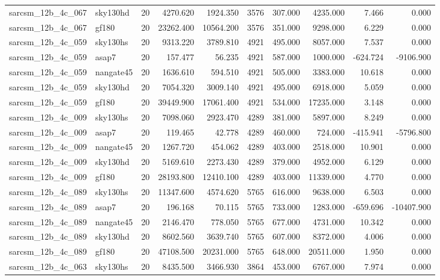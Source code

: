 \documentclass{article}
\begin{document}
\begin{longtable}{llrrrrrrrr}
sarcsm\_12b\_4c\_067 & sky130hd & 20 & 4270.620 & 1924.350 & 3576 & 307.000 & 4235.000 & 7.466 & 0.000 \\
sarcsm\_12b\_4c\_067 & gf180 & 20 & 23262.400 & 10564.200 & 3576 & 351.000 & 9298.000 & 6.229 & 0.000 \\
sarcsm\_12b\_4c\_059 & sky130hs & 20 & 9313.220 & 3789.810 & 4921 & 495.000 & 8057.000 & 7.537 & 0.000 \\
sarcsm\_12b\_4c\_059 & asap7 & 20 & 157.477 & 56.235 & 4921 & 587.000 & 1000.000 & -624.724 & -9106.900 \\
sarcsm\_12b\_4c\_059 & nangate45 & 20 & 1636.610 & 594.510 & 4921 & 505.000 & 3383.000 & 10.618 & 0.000 \\
sarcsm\_12b\_4c\_059 & sky130hd & 20 & 7054.320 & 3009.140 & 4921 & 495.000 & 6918.000 & 5.059 & 0.000 \\
sarcsm\_12b\_4c\_059 & gf180 & 20 & 39449.900 & 17061.400 & 4921 & 534.000 & 17235.000 & 3.148 & 0.000 \\
sarcsm\_12b\_4c\_009 & sky130hs & 20 & 7098.060 & 2923.470 & 4289 & 381.000 & 5897.000 & 8.249 & 0.000 \\
sarcsm\_12b\_4c\_009 & asap7 & 20 & 119.465 & 42.778 & 4289 & 460.000 & 724.000 & -415.941 & -5796.800 \\
sarcsm\_12b\_4c\_009 & nangate45 & 20 & 1267.720 & 454.062 & 4289 & 403.000 & 2518.000 & 10.901 & 0.000 \\
sarcsm\_12b\_4c\_009 & sky130hd & 20 & 5169.610 & 2273.430 & 4289 & 379.000 & 4952.000 & 6.129 & 0.000 \\
sarcsm\_12b\_4c\_009 & gf180 & 20 & 28193.800 & 12410.100 & 4289 & 403.000 & 11339.000 & 4.770 & 0.000 \\
sarcsm\_12b\_4c\_089 & sky130hs & 20 & 11347.600 & 4574.620 & 5765 & 616.000 & 9638.000 & 6.503 & 0.000 \\
sarcsm\_12b\_4c\_089 & asap7 & 20 & 196.168 & 70.115 & 5765 & 733.000 & 1283.000 & -659.696 & -10407.900 \\
sarcsm\_12b\_4c\_089 & nangate45 & 20 & 2146.470 & 778.050 & 5765 & 677.000 & 4731.000 & 10.342 & 0.000 \\
sarcsm\_12b\_4c\_089 & sky130hd & 20 & 8602.560 & 3639.740 & 5765 & 607.000 & 8372.000 & 4.006 & 0.000 \\
sarcsm\_12b\_4c\_089 & gf180 & 20 & 47108.500 & 20231.000 & 5765 & 648.000 & 20511.000 & 1.950 & 0.000 \\
sarcsm\_12b\_4c\_063 & sky130hs & 20 & 8435.500 & 3466.930 & 3864 & 453.000 & 6767.000 & 7.974 & 0.000 \\

\end{longtable}
\end{document}
